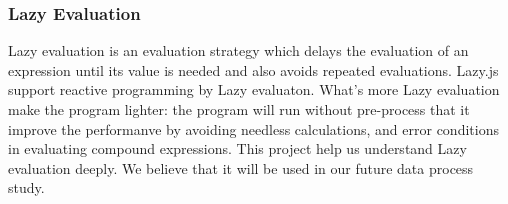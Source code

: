 \subsubsection{Lazy Evaluation}

Lazy evaluation is an evaluation strategy which delays the evaluation of an expression until its value is needed and also avoids repeated evaluations.\cite{pldc10} Lazy.js support reactive programming by Lazy evaluaton. What's more Lazy evaluation make the program lighter: the program will run without pre-process that it improve the performanve by avoiding needless calculations, and error conditions in evaluating compound expressions. This project help us understand Lazy evaluation deeply. We believe that it will be used in our future data process study.